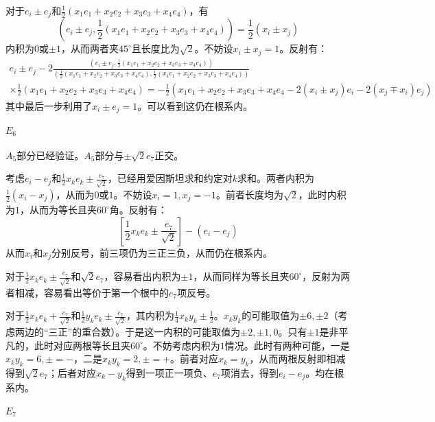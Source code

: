 \documentclass{ctexart}
\begin{document}
	对于$e_i\pm e_j$和$\frac{1}{2}(x_1e_1+x_2e_2+x_3e_3+x_4e_4)$，有
	\begin{equation}
	\left(e_i\pm e_j,\frac{1}{2}(x_1e_1+x_2e_2+x_3e_3+x_4e_4)\right)=\frac{1}{2}(x_i\pm x_j)
	\end{equation}
	内积为$0$或$\pm 1$，从而两者夹$45^\circ$且长度比为$\sqrt 2$。不妨设$x_i\pm x_j=1$。反射有：
	\begin{multline}
	e_i\pm e_j-2\frac{\left(e_i\pm e_j,\frac{1}{2}(x_1e_1+x_2e_2+x_3e_3+x_4e_4)\right)}{\left(\frac{1}{2}(x_1e_1+x_2e_2+x_3e_3+x_4e_4),\frac{1}{2}(x_1e_1+x_2e_2+x_3e_3+x_4e_4)\right)}\\\times\frac{1}{2}(x_1e_1+x_2e_2+x_3e_3+x_4e_4)=-\frac{1}{2}(x_1e_1+x_2e_2+x_3e_3+x_4e_4-2(x_i\pm x_j)e_i-2(x_j\mp x_i)e_j)
	\end{multline}
	其中最后一步利用了$x_i\pm e_j=1$。可以看到这仍在根系内。
	
	\paragraph{$E_6$}
	
	$A_5$部分已经验证。$A_5$部分与$\pm\sqrt 2e_7$正交。
	
	考虑$e_i-e_j$和$\frac{1}{2}x_ke_k\pm\frac{e_7}{\sqrt 2}$，已经用爱因斯坦求和约定对$k$求和。两者内积为$\frac{1}{2}(x_i-x_j)$，从而为$0$或$1$。不妨设$x_i=1,x_j=-1$。前者长度均为$\sqrt 2$，此时内积为$1$，从而为等长且夹$60^\circ$角。反射有：
	\begin{equation}
	\left[\frac{1}{2}x_ke_k\pm\frac{e_7}{\sqrt 2}\right]-(e_i-e_j)
	\end{equation}
	从而$x_i$和$x_j$分别反号，前三项仍为三正三负，从而仍在根系内。
	
	对于$\frac{1}{2}x_ke_k\pm\frac{e_7}{\sqrt 2}$和$\sqrt 2 e_7$，容易看出内积为$\pm 1$，从而同样为等长且夹$60^\circ$，反射为两者相减，容易看出等价于第一个根中的$e_7$项反号。
	
	对于$\frac{1}{2}x_ke_k+\frac{e_7}{\sqrt 2}$和$\frac{1}{2}y_ke_k\pm\frac{e_7}{\sqrt 2}$，其内积为$\frac{1}{4}x_ky_k\pm\frac{1}{2}$。$x_ky_k$的可能取值为$\pm 6,\pm 2$（考虑两边的“三正”的重合数）。于是这一内积的可能取值为$\pm 2,\pm 1,0$。只有$\pm 1$是非平凡的，此时对应两根等长且夹$60^\circ$。不妨考虑内积为$1$情况。此时有两种可能，一是$x_ky_k=6,\pm=-$，二是$x_ky_k=2,\pm=+$。前者对应$x_k=y_k$，从而两根反射即相减得到$\sqrt 2 e_7$；后者对应$x_k-y_k$得到一项正一项负、$e_7$项消去，得到$e_i-e_j$。均在根系内。
	
	\paragraph{$E_7$}
	
\end{document}
